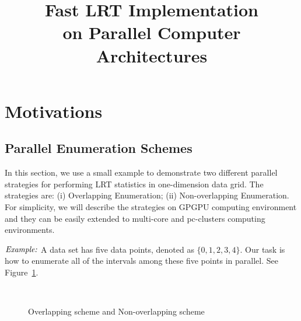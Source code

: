 \documentclass[10pt,journal,cspaper,compsoc]{IEEEtran}
\begin{document}
%
\title{ Fast LRT Implementation \\on Parallel Computer Architectures}


\maketitle

\IEEEdisplaynotcompsoctitleabstractindextext

\IEEEpeerreviewmaketitle

\section{Motivations}
\label{sec:mov}

\subsection{Parallel Enumeration Schemes}
\label{sec:mov1}
In this section, we use a small example to demonstrate two different parallel strategies for performing LRT statistics in one-dimension data grid. The strategies are: (i) Overlapping Enumeration; (ii) Non-overlapping Enumeration. For simplicity, we will describe the strategies on GPGPU computing environment and they can be easily extended to multi-core and pc-clusters computing environments.

$\noindent \textit {Example:}$  A data set has five data points, denoted as $\{0,1,2,3,4\}$. Our task is how to enumerate all of the intervals among these five points in parallel. See Figure~\ref{example1}.

\begin{figure}[h]
\centering
{}
~~\\
\caption{Overlapping scheme and Non-overlapping scheme}\label{example1}
\end{figure}
\end{document}
